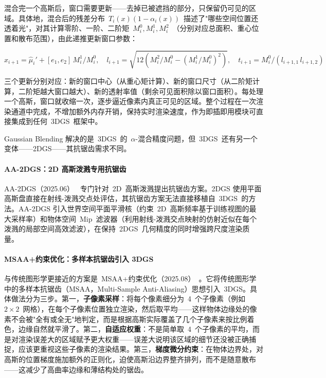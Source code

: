 混合完一个高斯后，窗口需要更新——去掉已被遮挡的部分，只保留仍可见的区域。具体地，混合后的残差分布~$T_i(x)(1-\alpha_i(x))$~描述了"哪些空间位置还透着光"，对其计算零阶、一阶、二阶矩~$M_i^0, M_i^1, M_i^2$~（分别对应总面积、重心位置和散布范围），由此递推更新窗口参数：

\begin{equation}
x_{i+1} = \hat{\mu}_i' + [e_1, e_2]\,M_i^1/M_i^0, \quad l_{i+1} = \sqrt{12(M_i^2/M_i^0 - (M_i^1/M_i^0)^2)}, \quad t_{i+1} = M_i^0 / (l_{i+1,1}\,l_{i+1,2})
\end{equation}

三个更新分别对应：新的窗口中心（从重心矩计算）、新的窗口尺寸（从二阶矩计算，二阶矩越大窗口越大）、新的透射率值（剩余可见面积除以窗口面积）。每处理一个高斯，窗口就收缩一次，逐步逼近像素内真正可见的区域。整个过程在一次渲染通道中完成，不增加额外内存开销，保持实时渲染速度，作为即插即用模块可直接集成到任何~3DGS~框架中。

Gaussian Blending 解决的是~3DGS~的~$\alpha$-混合精度问题，但~3DGS~还有另一个变体——2DGS——其抗锯齿需求不同。

\paragraph{AA-2DGS：2D 高斯泼溅专用抗锯齿}
AA-2DGS（2025.06）~\cite{2506_11252} 专门针对~2D~高斯泼溅提出抗锯齿方案。2DGS 使用平面高斯盘直接在射线-泼溅交点处评估，其抗锯齿方案无法直接移植自~3DGS~的方法。AA-2DGS 引入世界空间平面平滑核（约束~2D~高斯频率基于训练视图的最大采样率）和物体空间~Mip~滤波器（利用射线-泼溅交点映射的仿射近似在每个泼溅的局部空间高效滤波），在保持~2DGS~几何精度的同时增强跨尺度渲染质量。

\paragraph{MSAA+约束优化：多样本抗锯齿引入 3DGS}
与传统图形学更接近的方案是~MSAA+约束优化（2025.08）~\cite{2508_10507}。它将传统图形学中的多样本抗锯齿（MSAA，Multi-Sample Anti-Aliasing）思想引入~3DGS。具体做法分为三步。第一，\textbf{子像素采样}：将每个像素细分为~4~个子像素（例如~$2\times 2$~网格），在每个子像素位置独立渲染，然后取平均——这样物体边缘处的像素不会被"全有或全无"地判定，而是根据高斯实际覆盖了几个子像素来按比例着色，边缘自然就平滑了。第二，\textbf{自适应权重}：不是简单取~4~个子像素的平均，而是对渲染误差大的区域赋予更大权重——误差大说明该区域的细节还没被正确捕捉，应该更重视这些子像素的渲染结果。第三，\textbf{梯度微分约束}：在物体边界处，对高斯的位置梯度施加额外的正则化，迫使高斯沿边界整齐排列，而不是随意散布——这减少了高曲率边缘和薄结构处的锯齿。


